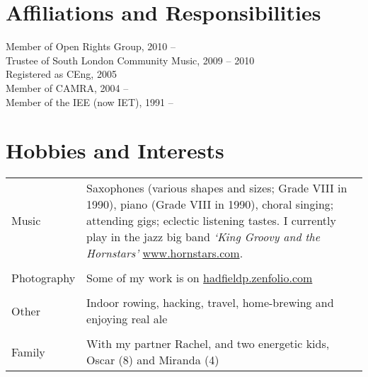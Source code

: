\documentclass[margin = 0cm,line]{resume}
\begin{document}
\begin{resume}
    \section{\mysidestyle Affiliations and Responsibilities}

    Member of Open Rights Group, 2010 --                                                              \vspace{0.5mm}\\%
    Trustee of South London Community Music, 2009 -- 2010                                             \vspace{0.5mm}\\%
    Registered as CEng, 2005                                                                          \vspace{0.5mm}\\%
    Member of CAMRA, 2004 --                                                                          \vspace{0.5mm}\\%
    Member of the IEE (now IET), 1991 --

    \section{\mysidestyle Hobbies and Interests}
    \vspace{1.5mm}
    \begin{table}[ht]
        \begin{tabular}{p{2cm} p{12cm}}
        {Music}&{Saxophones (various shapes and sizes; Grade VIII in 1990), piano (Grade VIII in 1990), choral singing;
                 attending gigs; eclectic listening tastes. I currently play in the jazz big band \textsl{`King Groovy
                 and the Hornstars'} \url{www.hornstars.com}. }\\                                     \vspace{0.5mm}\\%
	    {Photography}&{Some of my work is on \url{hadfieldp.zenfolio.com}}\\
                                                                                                      \vspace{0.5mm}\\%
		{Other}&{Indoor rowing, hacking, travel, home-brewing and enjoying real ale}\\                \vspace{0.5mm}\\%
		{Family}&{With my partner Rachel, and two energetic kids, Oscar (8) and Miranda (4)}\\
        \end{tabular}
    \end{table}

\end{resume}
\end{document}
